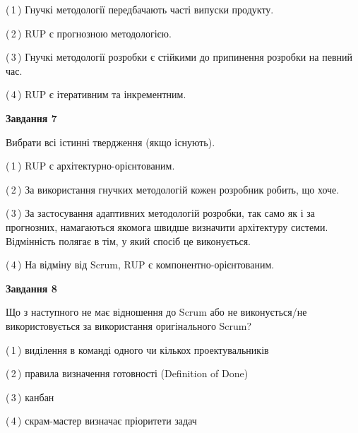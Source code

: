\documentclass[10pt, ukrainian]{article}
\begin{document}
{\begin {large}
(\,1\,) Гнучкі методології передбачають часті випуски продукту. %



(\,2\,) RUP є прогнозною методологією. %



(\,3\,) Гнучкі методології розробки є стійкими до припинення розробки на певний час. %



(\,4\,) RUP є ітеративним та інкрементним.%


{\begin {center}\textbf{Завдання 7}\end {center}}\par
Вибрати всі істинні твердження (якщо існують).\par
\vspace{2mm}



(\,1\,) RUP є архітектурно-орієнтованим. %



(\,2\,) За використання гнучких методологій кожен розробник робить, що хоче. %



(\,3\,) За застосування адаптивних методологій розробки, так само як і за прогнозних, намагаються якомога швидше визначити архітектуру системи. Відмінність полягає в тім, у який спосіб це виконується.%



(\,4\,) На відміну від Scrum, RUP є компонентно-орієнтованим. %


{\begin {center}\textbf{Завдання 8}\end {center}}\par
Що з наступного не має відношення до Scrum або не виконується/не використовується за використання оригінального Scrum?\par
\vspace{2mm}



(\,1\,) виділення в команді одного чи кількох проектувальників%



(\,2\,) правила визначення готовності (Definition of Done) %



(\,3\,) канбан%



(\,4\,) скрам-мастер визначає пріоритети задач%



\end{large}}
\end{document}

